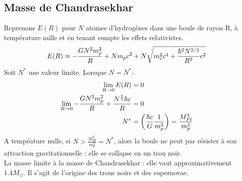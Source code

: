 \documentclass[../Notes de cours]{subfiles}
\begin{document}
\subsection{Masse de Chandrasekhar}
Reprenons $E(R)$ pour $N$ atomes d'hydrogènes dans une boule de rayon R, à température nulle et en tenant compte les effets relativistes.
\begin{equation}
E(R) \approx - \frac{GN^2 m_p^2}{R} + N m_p c^2 + N \sqrt{m_e^2c^4 + \frac{\hbar^2N^{2/3}}{R^2}c^2}
\end{equation}
Soit $N^*$ une valeur limite. Lorsque $N = N^*$:
\begin{align}
\lim_{R\to 0} E(R) &= 0\\
\lim_{R\to 0} - \frac{GN^2 m_p^2}{R} + \frac{N^{\frac{4}{3}}\hbar c}{R} &= 0\\
N^* &= \left( \frac{\hbar c}{G} \frac{1}{m_p^3} \right) = \frac{M_{Pl}^3}{m_p^3}
\end{align}
A tempéature nulle, si $N > \frac{M_{Pl}^3}{m_p^3} = N^*$, alors la boule ne peut pas résister à son attraction gravitationnelle : elle se collapse en un trou noir.\\

La masse limite à la masse de Chandrasekhar : elle vaut approximativement $1.4 M_\odot$. Il s'agit de l'origine des trous noirs et des supernovae.
\end{document}
